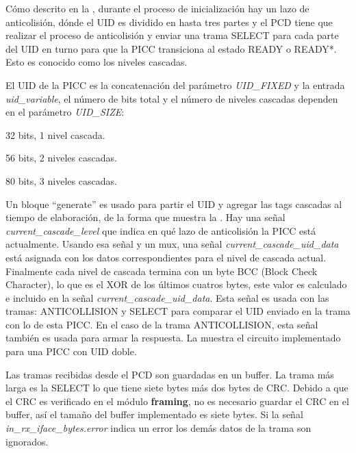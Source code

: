 \documentclass[a4paper, twoside, 11pt]{report}
\begin{document}
Cómo descrito en la , durante el proceso de inicialización hay un lazo de anticolisión, dónde el UID es dividido en hasta tres partes y el PCD tiene que realizar el proceso de anticolisión y enviar una trama SELECT para cada parte del UID en turno para que la PICC transiciona al estado READY o READY*. Esto es conocido como los niveles cascadas.

El UID de la PICC es la concatenación del parámetro \textit{UID\_FIXED} y la entrada \textit{uid\_var\-iable}, el número de bits total y el número de niveles cascadas dependen en el parámetro \textit{UID\_SIZE}:

\begin{description}[labelwidth=3.8cm]
    \item [UIDSize\_SINGLE:] 32 bits, 1 nivel cascada.
    \item [UIDSize\_DOUBLE:] 56 bits, 2 niveles cascadas.
    \item [UIDSize\_TRIPLE:] 80 bits, 3 niveles cascadas.
\end{description}

Un bloque “generate” es usado para partir el UID y agregar las tags cascadas al tiempo de elaboración, de la forma que muestra la . Hay una señal \textit{current\_cascade\_level} que indica en qué lazo de anticolisión la PICC está actualmente. Usando esa señal y un mux, una señal \textit{current\_cascade\_uid\_data} está asignada con los datos correspondientes para el nivel de cascada actual. Finalmente cada nivel de cascada termina con un byte BCC (Block Check Character), lo que es el XOR de los últimos cuatros bytes, este valor es calculado e incluido en la señal \textit{current\_cascade\_uid\_data}. Esta señal es usada con las tramas: ANTICOLLISION y SELECT para comparar el UID enviado en la trama con lo de esta PICC. En el caso de la trama ANTICOLLISION, esta señal también es usada para armar la respuesta. La  muestra el circuito implementado para una PICC con UID doble.

Las tramas recibidas desde el PCD son guardadas en un buffer. La trama más larga es la SELECT lo que tiene siete bytes más dos bytes de CRC. Debido a que el CRC es verificado en el módulo \textbf{framing}, no es necesario guardar el CRC en el buffer, así el tamaño del buffer implementado es siete bytes. Si la señal \textit{in\_rx\_iface\_bytes.error} indica un error los demás datos de la trama son ignorados.
\end{document}
